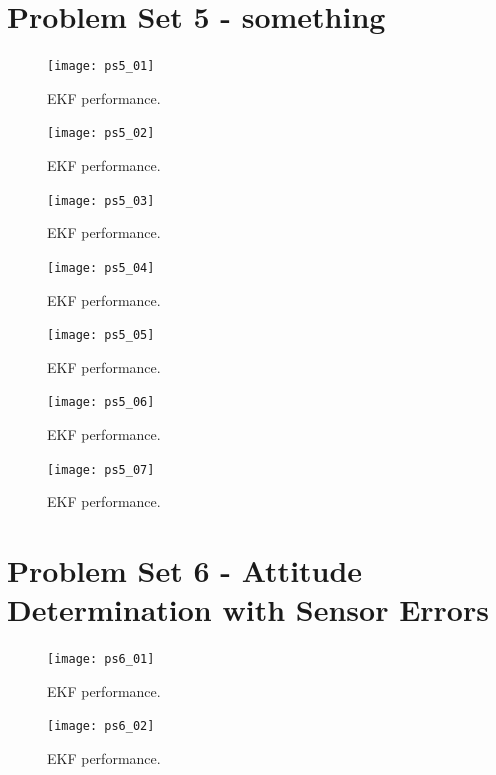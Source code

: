 \documentclass[12pt, letterpaper]{article}
\begin{document}
\section{Problem Set 5 - something}



\begin{figure}[H]
	\centering
	\texttt{[image: ps5\_01]}
	\caption{EKF performance.}
	\label{5:ekf}
\end{figure}


\begin{figure}[H]
	\centering
	\texttt{[image: ps5\_02]}
	\caption{EKF performance.}
	\label{5:ekf}
\end{figure}


\begin{figure}[H]
	\centering
	\texttt{[image: ps5\_03]}
	\caption{EKF performance.}
	\label{5:ekf}
\end{figure}


\begin{figure}[H]
	\centering
	\texttt{[image: ps5\_04]}
	\caption{EKF performance.}
	\label{5:ekf}
\end{figure}


\begin{figure}[H]
	\centering
	\texttt{[image: ps5\_05]}
	\caption{EKF performance.}
	\label{5:ekf}
\end{figure}


\begin{figure}[H]
	\centering
	\texttt{[image: ps5\_06]}
	\caption{EKF performance.}
	\label{5:ekf}
\end{figure}


\begin{figure}[H]
	\centering
	\texttt{[image: ps5\_07]}
	\caption{EKF performance.}
	\label{5:ekf}
\end{figure}

\section{Problem Set 6 - Attitude Determination with Sensor Errors}



\begin{figure}[H]
	\centering
	\texttt{[image: ps6\_01]}
	\caption{EKF performance.}
	\label{6:ekf}
\end{figure}


\begin{figure}[H]
	\centering
	\texttt{[image: ps6\_02]}
	\caption{EKF performance.}
	\label{6:ekf}
\end{figure}
\end{document}

